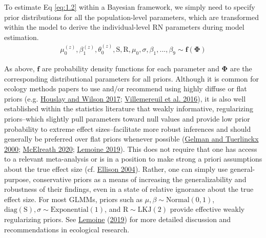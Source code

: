 \documentclass{article}
\begin{document}
To estimate Eq \ref{eq:1.2} within a Bayesian framework, we simply need
to specify prior distributions for all the population-level parameters,
which are transformed within the model to derive the individual-level RN
parameters during model estimation. \begin{align*}
\mu_0^{(z)},\beta_1^{(z)}, \theta_0^{(z)}, \boldsymbol{\mathrm{S}}, \boldsymbol{\mathrm{R}}, \mu_0, \sigma, \beta_1, ... , \beta_9
\sim \boldsymbol{f}(\boldsymbol{\Phi})
\end{align*}

As above, \(\boldsymbol{f}\) are probability density functions for each
parameter and \(\boldsymbol{\Phi}\) are the corresponding distributional
parameters for all priors. Although it is common for ecology methods
papers to use and/or recommend using highly diffuse or flat priors (e.g.
\protect\hyperlink{ref-Hous2017}{Houslay and Wilson 2017};
\protect\hyperlink{ref-Vill2016}{Villemereuil et al. 2016}), it is also
well established within the statistics literature that weakly
informative, regularizing priors--which slightly pull parameters toward
null values and provide low prior probability to extreme effect
sizes--facilitate more robust inferences and should generally be
preferred over flat priors whenever possible
(\protect\hyperlink{ref-Gelman2000}{Gelman and Tuerlinckx 2000};
\protect\hyperlink{ref-Rethinking}{McElreath 2020};
\protect\hyperlink{ref-Lemoine2019}{Lemoine 2019}). This does not
require that one has access to a relevant meta-analysis or is in a
position to make strong a priori assumptions about the true effect size
(cf. \protect\hyperlink{ref-Ellison2004}{Ellison 2004}). Rather, one can
simply use general-purpose, conservative priors as a means of increasing
the generalizability and robustness of their findings, even in a state
of relative ignorance about the true effect size. For most GLMMs, priors
such as \(\mu,\beta \sim \mathrm{Normal}(0,1)\),
\(\mathrm{diag}(\boldsymbol{\mathrm{S}}),\sigma \sim \mathrm{Exponential}(1)\),
and \(\boldsymbol{\mathrm{R}} \sim \mathrm{LKJ}(2)\) provide effective
weakly regularizing priors. See
\protect\hyperlink{ref-Lemoine2019}{Lemoine}
(\protect\hyperlink{ref-Lemoine2019}{2019}) for more detailed discussion
and recommendations in ecological research.
\end{document}
